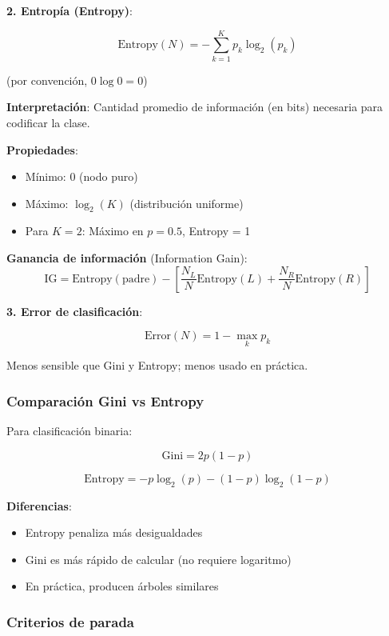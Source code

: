 \documentclass[
  doc,
  floatsintext,
  longtable,
  a4paper,
  nolmodern,
  notxfonts,
  notimes,
  12pt,
  colorlinks=true,linkcolor=blue,citecolor=blue,urlcolor=blue]{apa7}
\providecommand{\tightlist}{%
  \setlength{\itemsep}{0pt}\setlength{\parskip}{0pt}}
\begin{document}
\textbf{2. Entropía (Entropy)}:

\[
\text{Entropy}(N) = -\sum_{k=1}^{K} p_k \log_2(p_k)
\]

(por convención, \(0 \log 0 = 0\))

\textbf{Interpretación}: Cantidad promedio de información (en bits)
necesaria para codificar la clase.

\textbf{Propiedades}:

\begin{itemize}
\tightlist
\item
  Mínimo: 0 (nodo puro)
\item
  Máximo: \(\log_2(K)\) (distribución uniforme)
\item
  Para \(K=2\): Máximo en \(p=0.5\), Entropy = 1
\end{itemize}

\textbf{Ganancia de información} (Information Gain): \[
\text{IG} = \text{Entropy}(\text{padre}) - \left[\frac{N_L}{N}\text{Entropy}(L) + \frac{N_R}{N}\text{Entropy}(R)\right]
\]

\textbf{3. Error de clasificación}:

\[
\text{Error}(N) = 1 - \max_k p_k
\]

Menos sensible que Gini y Entropy; menos usado en práctica.

\subsubsection{Comparación Gini vs
Entropy}\label{comparaciuxf3n-gini-vs-entropy}

Para clasificación binaria:

\[
\text{Gini} = 2p(1-p)
\]

\[
\text{Entropy} = -p\log_2(p) - (1-p)\log_2(1-p)
\]

\textbf{Diferencias}:

\begin{itemize}
\tightlist
\item
  Entropy penaliza más desigualdades
\item
  Gini es más rápido de calcular (no requiere logaritmo)
\item
  En práctica, producen árboles similares
\end{itemize}

\subsubsection{Criterios de parada}\label{criterios-de-parada}
\end{document}

